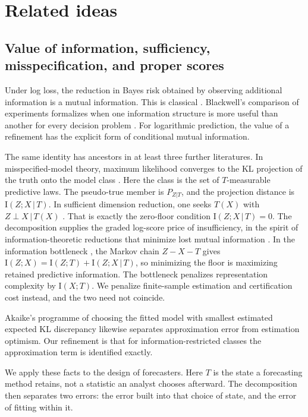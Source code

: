 \documentclass[11pt]{article}
\theoremstyle{remark}
\newcommand{\I}{\mathrm{I}}
\newcommand{\given}{\,|\,}
\begin{document}
\section{Related ideas}\label{sec:related}

\subsection{Value of information, sufficiency, misspecification, and proper scores}

Under log loss, the reduction in Bayes risk obtained by observing additional information is a
mutual information. This is classical \citep{lindley1956measure,degroot1962uncertainty}.
Blackwell's comparison of experiments formalizes when one information structure is more useful
than another for every decision problem \citep{blackwell1953equivalent}. For logarithmic
prediction, the value of a refinement has the explicit form of conditional mutual
information.

The same identity has ancestors in at least three further literatures. In misspecified-model
theory, maximum likelihood converges to the KL projection of the truth onto the model class
\citep{white1982maximum}. Here the class is the set of $T$-measurable predictive laws. The
pseudo-true member is $P_{Z|T}$, and the projection distance is $\I(Z;X\given T)$. In
sufficient dimension reduction, one seeks $T(X)$ with $Z\perp X\given T(X)$
\citep{li1991sliced,fukumizu2004dimensionality}. That is exactly the zero-floor condition
$\I(Z;X\given T)=0$. The decomposition supplies the graded log-score price of
insufficiency, in the spirit of information-theoretic reductions that minimize lost mutual
information \citep{globerson2003sufficient}. In the information bottleneck
\citep{tishby1999information}, the Markov chain $Z-X-T$ gives
$\I(Z;X)=\I(Z;T)+\I(Z;X\given T)$, so minimizing the floor is maximizing retained
predictive information. The bottleneck penalizes representation complexity by $\I(X;T)$. We
penalize finite-sample estimation and certification cost instead, and the two need not
coincide.

Akaike's programme of choosing the fitted model with smallest estimated expected KL
discrepancy \citep{akaike1974new} likewise separates approximation error from estimation
optimism. Our refinement is that for information-restricted classes the approximation term is
identified exactly.

We apply these facts to the design of forecasters. Here $T$ is the state a forecasting
method retains, not a statistic an analyst chooses afterward. The decomposition then
separates two errors: the error built into that choice of state, and the error of fitting
within it.
\end{document}
